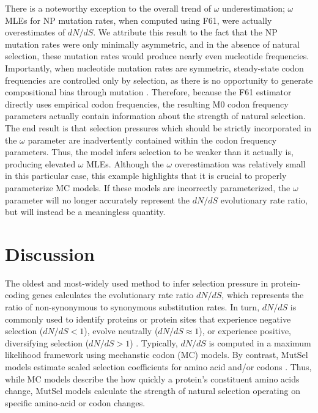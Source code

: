 \documentclass{pnastwo}
\begin{document}
\begin{article}
There is a noteworthy exception to the overall trend of $\omega$ underestimation; $\omega$ MLEs for NP mutation rates, when computed using F61, were actually overestimates of $dN/dS$. We attribute this result to the fact that the NP mutation rates were only minimally asymmetric, and in the absence of natural selection, these mutation rates would produce nearly even nucleotide frequencies. Importantly, when nucleotide mutation rates are symmetric, steady-state codon frequencies are controlled only by selection, as there is no opportunity to generate compositional bias through mutation \cite{SellaHirsh2005}. Therefore, because the F61 estimator directly uses empirical codon frequencies, the resulting M0 codon frequency parameters actually contain information about the strength of natural selection. The end result is that selection pressures which should be strictly incorporated in the $\omega$ parameter are inadvertently contained within the codon frequency parameters. Thus, the model infers selection to be weaker than it actually is, producing elevated $\omega$ MLEs. Although the $\omega$ overestimation was relatively small in this particular case, this example highlights that it is crucial to properly parameterize MC models. If these models are incorrectly parameterized, the $\omega$ parameter will no longer accurately represent the $dN/dS$ evolutionary rate ratio, but will instead be a meaningless quantity.



\section*{Discussion}

The oldest and most-widely used method to infer selection pressure in protein-coding genes calculates the evolutionary rate ratio $dN/dS$, which represents the ratio of non-synonymous to synonymous substitution rates. In turn, $dN/dS$ is commonly used to identify proteins or protein sites that experience negative selection ($dN/dS<1$), evolve neutrally ($dN/dS\approx1$), or experience positive, diversifying selection ($dN/dS>1$) \cite{NielsenYang1998, Yangetal2000, KosakovskyPondFrost2005b}. Typically, $dN/dS$ is computed in a maximum likelihood framework using mechanstic codon (MC) models. By contrast, MutSel models estimate scaled selection coefficients for amino acid and/or codons \cite{HalpernBruno1998,Rodrigueetal2010,Tamurietal2012,Thorne2012,Tamurietal2014}. Thus, while MC models describe the how quickly a protein's constituent amino acids change, MutSel models calculate the strength of natural selection operating on specific amino-acid or codon changes.  


\end{article}
\end{document}

